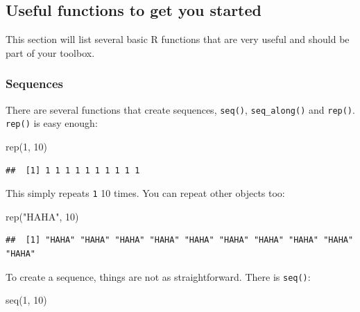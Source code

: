 \documentclass[
]{article}
\newenvironment{Shaded}{\begin{snugshade}}{\end{snugshade}}
\newcommand{\DecValTok}[1]{\textcolor[rgb]{0.00,0.00,0.81}{#1}}
\newcommand{\FunctionTok}[1]{\textcolor[rgb]{0.00,0.00,0.00}{#1}}
\newcommand{\NormalTok}[1]{#1}
\newcommand{\StringTok}[1]{\textcolor[rgb]{0.31,0.60,0.02}{#1}}
\begin{document}
\hypertarget{useful-functions-to-get-you-started}{%
\subsection{Useful functions to get you started}\label{useful-functions-to-get-you-started}}

This section will list several basic R functions that are very useful and should be part of your toolbox.

\hypertarget{sequences}{%
\subsubsection{Sequences}\label{sequences}}

There are several functions that create sequences, \texttt{seq()}, \texttt{seq\_along()} and \texttt{rep()}. \texttt{rep()} is easy enough:

\begin{Shaded}
\begin{Highlighting}[]
\FunctionTok{rep}\NormalTok{(}\DecValTok{1}\NormalTok{, }\DecValTok{10}\NormalTok{)}
\end{Highlighting}
\end{Shaded}

\begin{verbatim}
##  [1] 1 1 1 1 1 1 1 1 1 1
\end{verbatim}

This simply repeats \texttt{1} 10 times. You can repeat other objects too:

\begin{Shaded}
\begin{Highlighting}[]
\FunctionTok{rep}\NormalTok{(}\StringTok{"HAHA"}\NormalTok{, }\DecValTok{10}\NormalTok{)}
\end{Highlighting}
\end{Shaded}

\begin{verbatim}
##  [1] "HAHA" "HAHA" "HAHA" "HAHA" "HAHA" "HAHA" "HAHA" "HAHA" "HAHA" "HAHA"
\end{verbatim}

To create a sequence, things are not as straightforward. There is \texttt{seq()}:

\begin{Shaded}
\begin{Highlighting}[]
\FunctionTok{seq}\NormalTok{(}\DecValTok{1}\NormalTok{, }\DecValTok{10}\NormalTok{)}
\end{Highlighting}
\end{Shaded}
\end{document}
